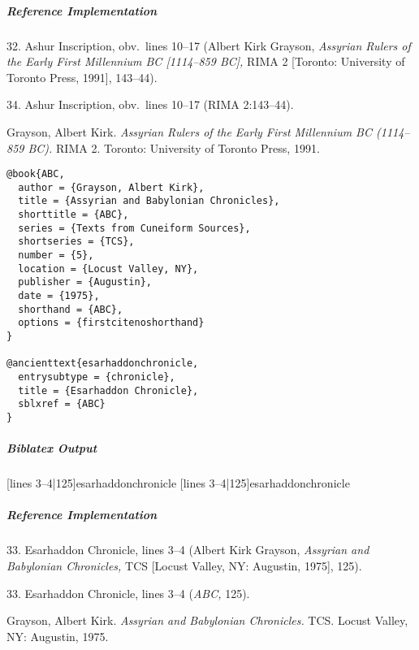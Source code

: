 \documentclass[a4paper]{article}
\newenvironment{biboutput}{%
  \subparagraph{Biblatex Output}
}{\color{black}}
\newenvironment{refimp}{%
  \subparagraph{Reference Implementation}
  \color{reference-colour}
  \rm
}{\par\color{black}}
\begin{document}
\begin{refimp}
  32. Ashur Inscription, obv.\ lines 10–17 (Albert Kirk Grayson,
  \emph{Assyrian Rulers of the Early First Millennium BC [1114–859 BC],} RIMA
  2 [Toronto: University of Toronto Press, 1991], 143–44).

  34. Ashur Inscription, obv.\ lines 10–17 (RIMA 2:143–44).

  \hangindent\bibindent Grayson, Albert Kirk. \emph{Assyrian Rulers of the
  Early First Millennium BC (1114–859 BC).} RIMA 2. Toronto: University of
  Toronto Press, 1991.

\end{refimp}

\medskip

\begin{lstlisting}
@book{ABC,
  author = {Grayson, Albert Kirk},
  title = {Assyrian and Babylonian Chronicles},
  shorttitle = {ABC},
  series = {Texts from Cuneiform Sources},
  shortseries = {TCS},
  number = {5},
  location = {Locust Valley, NY},
  publisher = {Augustin},
  date = {1975},
  shorthand = {ABC},
  options = {firstcitenoshorthand}
}

@ancienttext{esarhaddonchronicle,
  entrysubtype = {chronicle},
  title = {Esarhaddon Chronicle},
  sblxref = {ABC}
}
\end{lstlisting}

\begin{biboutput}
  [lines 3--4|125]{esarhaddonchronicle}
  [lines 3--4|125]{esarhaddonchronicle}
\end{biboutput}

\begin{refimp}
  33. Esarhaddon Chronicle, lines 3–4 (Albert Kirk Grayson, \emph{Assyrian and
  Babylonian Chronicles,} TCS [Locust Valley, NY: Augustin, 1975], 125).

  33. Esarhaddon Chronicle, lines 3–4 (\emph{ABC,} 125).

  \hangindent\bibindent Grayson, Albert Kirk. \emph{Assyrian and Babylonian
  Chronicles.} TCS. Locust Valley, NY: Augustin, 1975.


\end{refimp}
\end{document}
